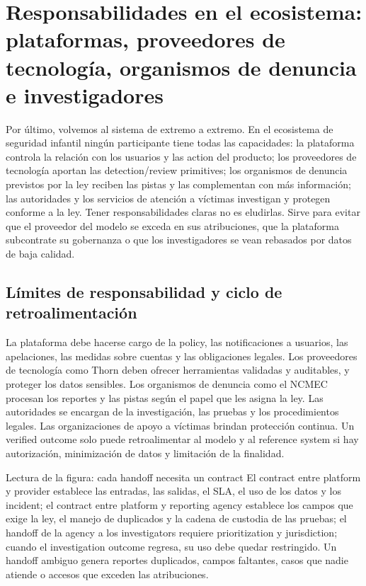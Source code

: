 \section{Responsabilidades en el ecosistema: plataformas, proveedores de tecnología, organismos de denuncia e investigadores}

Por último, volvemos al sistema de extremo a extremo. En el ecosistema de seguridad infantil ningún participante tiene todas las capacidades: la plataforma controla la relación con los usuarios y las action del producto; los proveedores de tecnología aportan las detection/review primitives; los organismos de denuncia previstos por la ley reciben las pistas y las complementan con más información; las autoridades y los servicios de atención a víctimas investigan y protegen conforme a la ley. Tener responsabilidades claras no es eludirlas. Sirve para evitar que el proveedor del modelo se exceda en sus atribuciones, que la plataforma subcontrate su gobernanza o que los investigadores se vean rebasados por datos de baja calidad.

\subsection{Límites de responsabilidad y ciclo de retroalimentación}

La plataforma debe hacerse cargo de la policy, las notificaciones a usuarios, las apelaciones, las medidas sobre cuentas y las obligaciones legales. Los proveedores de tecnología como Thorn deben ofrecer herramientas validadas y auditables, y proteger los datos sensibles. Los organismos de denuncia como el NCMEC procesan los reportes y las pistas según el papel que les asigna la ley. Las autoridades se encargan de la investigación, las pruebas y los procedimientos legales. Las organizaciones de apoyo a víctimas brindan protección continua. Un verified outcome solo puede retroalimentar al modelo y al reference system si hay autorización, minimización de datos y limitación de la finalidad.


\begin{knowledgebox}{Lectura de la figura: cada handoff necesita un contract}
El contract entre platform y provider establece las entradas, las salidas, el SLA, el uso de los datos y los incident; el contract entre platform y reporting agency establece los campos que exige la ley, el manejo de duplicados y la cadena de custodia de las pruebas; el handoff de la agency a los investigators requiere prioritization y jurisdiction; cuando el investigation outcome regresa, su uso debe quedar restringido. Un handoff ambiguo genera reportes duplicados, campos faltantes, casos que nadie atiende o accesos que exceden las atribuciones.
\end{knowledgebox}

